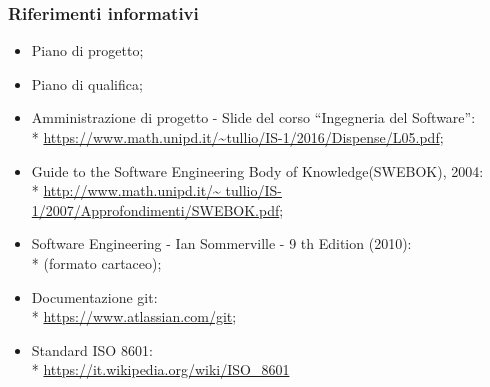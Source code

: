 \subsubsection{Riferimenti informativi}
\begin{itemize}
\item Piano di progetto;
\item Piano di qualifica;
\item Amministrazione di progetto - Slide del corso “Ingegneria del
Software”: \\*
	\url{https://www.math.unipd.it/~tullio/IS-1/2016/Dispense/L05.pdf};
\item Guide to the Software Engineering Body of Knowledge(SWEBOK), 2004: \\*
	\url{http://www.math.unipd.it/~	tullio/IS-1/2007/Approfondimenti/SWEBOK.pdf};
\item Software Engineering - Ian Sommerville - 9 th Edition (2010): \\*
(formato cartaceo);
\item Documentazione git: \\*
	\url{https://www.atlassian.com/git};
	\item Standard ISO 8601: \\*
	\url{https://it.wikipedia.org/wiki/ISO_8601}
\end{itemize}